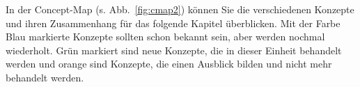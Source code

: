 In der Concept-Map (s. Abb.~\ref{fig:cmap2}) können Sie die verschiedenen Konzepte und ihren Zusammenhang für das folgende Kapitel überblicken. 
Mit der Farbe Blau markierte Konzepte sollten schon bekannt sein, aber werden nochmal wiederholt.
Grün markiert sind neue Konzepte, die in dieser Einheit behandelt werden und orange sind Konzepte, die einen Ausblick bilden und nicht mehr behandelt werden. 

